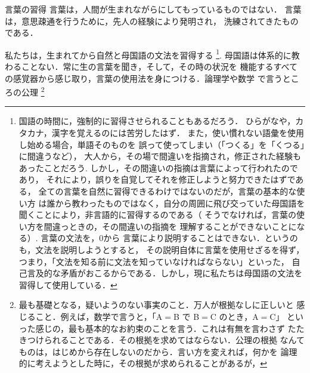             \begin{memo}{言葉の習得}
                言葉は，人間が生まれながらにしてもっているものではない．
                言葉は，意思疎通を行うために，先人の経験により発明され，
                洗練されてきたものである．

                私たちは，生まれてから自然と母国語の文法を習得する
                    \footnote{
                        国語の時間に，強制的に習得させられることもあるだろう．
                        ひらがなや，カタカナ，漢字を覚えるのには苦労したはず．
                        また，使い慣れない語彙を使用し始める場合，単語そのものを
                        誤って使ってしまい（「つくる」を「くつる」に間違うなど），
                        大人から，その場で間違いを指摘され，修正された経験もあったことだろう.
                        しかし，その間違いの指摘は言葉によって行われたのであり，
                        それにより，誤りを自覚してそれを修正しようと努力できたはずである，
                        全ての言葉を自然に習得できるわけではないのだが，言葉の基本的な使い方
                        は誰から教わったものではなく，自分の周囲に飛び交っていた母国語を
                        聞くことにより，非言語的に習得するのである（
                        そうでなければ，言葉の使い方を間違っときの，その間違いの指摘を
                        理解することができないことになる）.
                        言葉の文法を，0から
                        言葉により説明することはできない．というのも，文法を説明しようとすると，
                        その説明自体に言葉を使用せざるを得ず，
                        つまり，「文法を知る前に文法を知っていなければならない」といった，
                        自己言及的な矛盾がおこるからである．しかし，現に私たちは母国語の文法を
                        習得して使用している．
                    }.
                母国語は体系的に教わることない．常に生の言葉を聞き，そして，その時の状況を
                機能するすべての感覚器から感じ取り，言葉の使用法を身につける．論理学や数学
                で言うところの公理
                    \footnote{
                        最も基礎となる，疑いようのない事実のこと．万人が根拠なしに正しいと
                        感じること．例えば，数学で言うと，「A$=$B で B$=$C のとき，A$=$C」
                        といった感じの，最も基本的なお約束のことを言う．これは有無を言わさず
                        たたきつけられることである．その根拠を求めてはならない．公理の根拠
                        なんてものは，はじめから存在しないのだから．言い方を変えれば，何かを
                        論理的に考えようとした時に，その根拠が求められることがあるが，
}
\end{memo}
